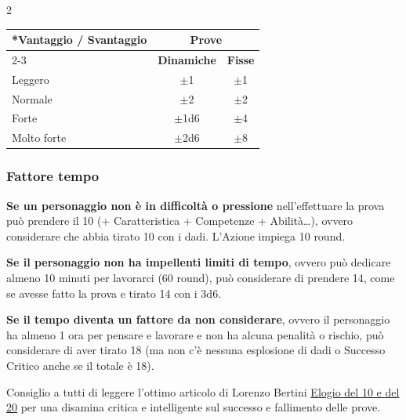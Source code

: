 \begin{multicols}{2}
\noindent\begin{tabular}{lcc}
	\toprule
\rowcolor{gray!20}\multirow{2}*{\textbf{Vantaggio / Svantaggio}} & \multicolumn{2}{c}{\textbf{Prove}}\\
\cmidrule(lr){2-3} & \textbf{Dinamiche} & \textbf{Fisse} \\
\toprule
Leggero & $\pm$1 & $\pm$1\\
\rowcolor{gray!20}Normale & $\pm$2 & $\pm$2\\
Forte & $\pm$1d6 & $\pm$4\\
\rowcolor{gray!20}Molto forte & $\pm$2d6 & $\pm$8
\end{tabular}


\subsubsection{Fattore tempo}\label{fattoretempo}

\textbf{Se un personaggio non è in difficoltà o pressione} nell'effettuare la prova può prendere il 10 (+ Caratteristica + Competenze + Abilità…), ovvero considerare che abbia tirato 10 con i dadi. L'Azione impiega 10 round. \label{prendere10}\hypertarget{prendere10}{}

\textbf{Se il personaggio non ha impellenti limiti di tempo}, ovvero può dedicare almeno 10 minuti per lavorarci (60 round), può considerare di prendere 14, come se avesse fatto la prova e tirato 14 con i 3d6. \label{prendere14}

\textbf{Se il tempo diventa un fattore da non considerare}, ovvero il personaggio ha almeno 1 ora per pensare e lavorare e non ha alcuna penalità o rischio, può considerare di aver tirato 18 (ma non c'è nessuna esplosione di dadi o Successo Critico anche se il totale è 18).\label{prendere18}

\begin{narratore}
Consiglio a tutti di leggere l'ottimo articolo di Lorenzo Bertini \href{https://dietroschermo.wordpress.com/2022/03/10/elogio-del-10-e-del-20}{Elogio del 10 e del 20} per una disamina critica e intelligente sul successo e fallimento delle prove.
\end{narratore}


\end{multicols}
